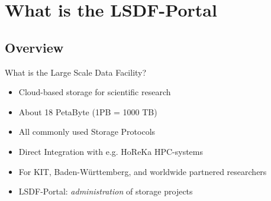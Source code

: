 \section{What is the LSDF-Portal}



\subsection{Overview}
\begin{frame}[c]{What is the Large Scale Data Facility?}
    \large
    \begin{itemize}[<+(1)->]
        \item Cloud-based storage for scientific research
        \item About 18 PetaByte (1PB = 1000 TB)
        \item All commonly used Storage Protocols
        \item Direct Integration with e.g. HoReKa HPC-systems
        \item For KIT, Baden-Württemberg, and worldwide partnered researchers
        \item LSDF-Portal: {\em administration} of storage projects
    \end{itemize}
\end{frame}


